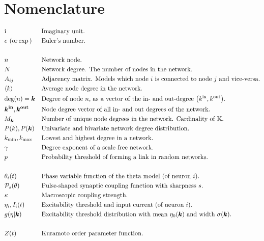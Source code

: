 \newpage
\section*{Nomenclature}
\vspace{-.5cm}
\begin{alignat*}{2}
& \ic &&\text{Imaginary unit.}\\
&e \text{ (or} \exp\text{)} &&\text{Euler's number.}\\ \\
& n&&\text{Network node.}\\
& N &&\text{Network degree. The number of nodes in the network.}\\
& A_{ij} &&\text{Adjacency matrix. Models which node $i$ is connected to node $j$ and vice-versa.}\\
& \kmean &&\text{Average node degree in the network.}\\
& \degree(n) = \k &&\text{Degree of node $n$, as a vector of the in- and out-degree $\left(\kin, \kout \right)$.}\\
& \kinb, \koutb && \text{Node degree vector of all in- and out degrees of the network.} \\
& M_{\k} &&\text{Number of unique node degrees in the network. Cardinality of $\K$.}\\
& P(k), P(\k) &&\text{Univariate and bivariate network degree distribution.}\\
&\kmin, \kmax &&\text{Lowest and highest degree in a network.}\\ 
&\gamma &&\text{Degree exponent of a scale-free network.}\\ 
&p &&\text{Probability threshold of forming a link in random networks.}\\ \\
&\theta_i(t) &&\text{Phase variable function of the theta model (of neuron $i$).}\\
& \Pulse_s (\theta)&&\text{Pulse-shaped synaptic coupling function with sharpness } s \text{.}\\
&\kappa &&\text{Macroscopic coupling strength.}\\
&\eta_i, I_i(t) &&\text{Excitability threshold and input current (of neuron $i$).}\\
&g(\eta \rvert \k) \quad &&\text{Excitability threshold distribution with mean $\eta_0(\k)$ and width $\sigma(\k)$.}\\ \\
& Z(t) &&\text{Kuramoto order parameter function.}\\

\end{alignat*}
